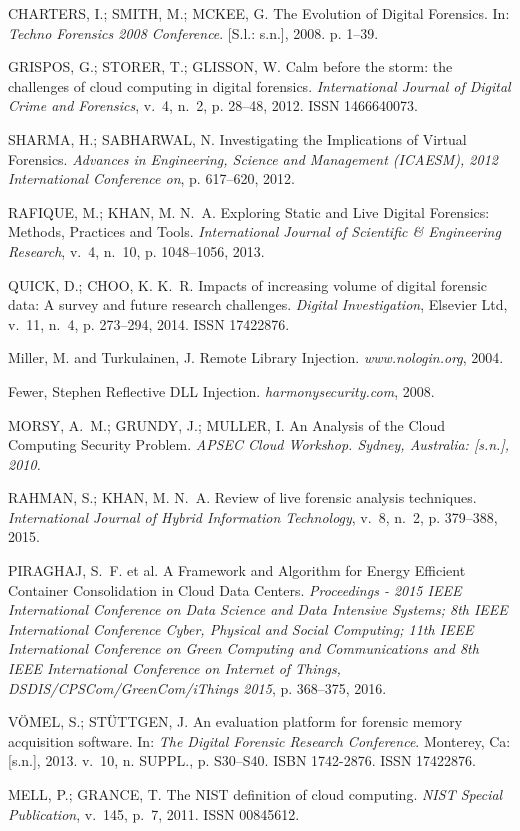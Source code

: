 \documentclass[conference]{IEEEtran}
\begin{document}
\begin{thebibliography}{1}
{CHARTERS, I.; SMITH, M.; MCKEE, G. {The Evolution of Digital Forensics}. In:
  \emph{Techno Forensics 2008 Conference}. [S.l.: s.n.], 2008. p. 1--39.}

{GRISPOS, G.; STORER, T.; GLISSON, W. {Calm before the storm: the challenges of
  cloud computing in digital forensics}.
\emph{International Journal of Digital Crime and Forensics}, v.~4, n.~2, p.
  28--48, 2012.
ISSN 1466640073.}

{SHARMA, H.; SABHARWAL, N. {Investigating the Implications of Virtual
  Forensics}.
\emph{Advances in Engineering, Science and Management (ICAESM), 2012
  International Conference on}, p. 617--620, 2012.}
  
{RAFIQUE, M.; KHAN, M. N.~A. {Exploring Static and Live Digital Forensics:
  Methods, Practices and Tools}.
\emph{International Journal of Scientific {\&} Engineering Research}, v.~4,
  n.~10, p. 1048--1056, 2013.}
  
{QUICK, D.; CHOO, K. K.~R. {Impacts of increasing volume of digital forensic
  data: A survey and future research challenges}.
\emph{Digital Investigation}, Elsevier Ltd, v.~11, n.~4, p. 273--294, 2014.
ISSN 17422876.}

{Miller, M. and Turkulainen, J. {Remote Library Injection}.
\emph{www.nologin.org}, 2004. }

{Fewer, Stephen {Reflective DLL Injection}.
\emph{harmonysecurity.com}, 2008. }

{MORSY, A.~M.; GRUNDY, J.; MULLER, I. An Analysis of the Cloud Computing
  Security Problem}.
\emph{APSEC Cloud Workshop. Sydney, Australia: [s.n.], 2010.}

{RAHMAN, S.; KHAN, M. N.~A. {Review of live forensic analysis techniques}.
\emph{International Journal of Hybrid Information Technology}, v.~8, n.~2, p.
  379--388, 2015.}
  
{PIRAGHAJ, S.~F. et al. {A Framework and Algorithm for Energy Efficient
  Container Consolidation in Cloud Data Centers}.
\emph{Proceedings - 2015 IEEE International Conference on Data Science and Data
  Intensive Systems; 8th IEEE International Conference Cyber, Physical and
  Social Computing; 11th IEEE International Conference on Green Computing and
  Communications and 8th IEEE International Conference on Internet of Things,
  DSDIS/CPSCom/GreenCom/iThings 2015}, p. 368--375, 2016.}
  
{V{\"{O}}MEL, S.; ST{\"{U}}TTGEN, J. {An evaluation platform for forensic
  memory acquisition software}. In:  \emph{The Digital Forensic Research
  Conference}. Monterey, Ca: [s.n.], 2013. v.~10, n. SUPPL., p. S30--S40.
ISBN 1742-2876.
ISSN 17422876.}

{MELL, P.; GRANCE, T. {The NIST definition of cloud computing}.
\emph{NIST Special Publication}, v.~145, p.~7, 2011. ISSN 00845612.}

\end{thebibliography}

\end{document}
